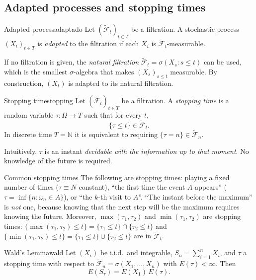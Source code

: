 \documentclass[11pt, a4paper]{article}
\begin{document}
\subsection{Adapted processes and stopping times}

\begin{definicion}{Adapted process}{adaptado}
Let $(\widetilde{\mathcal{F}}_t)_{t \in T}$ be a filtration. A stochastic process
$(X_t)_{t \in T}$ is \emph{adapted} to the filtration if each $X_t$ is
$\widetilde{\mathcal{F}}_t$-measurable.
\end{definicion}

\obs If no filtration is given, the \emph{natural filtration}
$\widetilde{\mathcal{F}}_t = \sigma(X_s : s \le t)$ can be used, which is the smallest $\sigma$-algebra that
makes $(X_s)_{s \le t}$ measurable. By construction, $(X_t)$ is adapted to its natural filtration.

\begin{definicion}{Stopping time}{stopping}
Let $(\widetilde{\mathcal{F}}_t)_{t \in T}$ be a filtration. A \emph{stopping time} is a random
variable $\tau: \Omega \to T$ such that for every $t$,
$$ \{\tau \le t\} \in \widetilde{\mathcal{F}}_t. $$
In discrete time $T = \mathbb{N}$ it is equivalent to requiring $\{\tau = n\} \in \widetilde{\mathcal{F}}_n$.
\end{definicion}

\obs Intuitively, $\tau$ is an instant \emph{decidable with the information up to that moment}.
No knowledge of the future is required.

\begin{ejemplo}{Common stopping times}{}
The following are stopping times: playing a fixed number of times ($\tau \equiv N$ constant), ``the first time
the event $A$ appears'' ($\tau = \inf\{n : \omega_n \in A\}$), or ``the $k$-th visit to
$A$''. ``The instant before the maximum'' is \emph{not} one, because knowing that the next step
will be the maximum requires knowing the future. Moreover, $\max(\tau_1, \tau_2)$ and $\min(\tau_1,
\tau_2)$ are stopping times: $\{\max(\tau_1, \tau_2) \le t\} = \{\tau_1 \le t\} \cap \{\tau_2 \le
t\}$ and $\{\min(\tau_1, \tau_2) \le t\} = \{\tau_1 \le t\} \cup \{\tau_2 \le t\}$ are in
$\widetilde{\mathcal{F}}_t$.
\end{ejemplo}

\begin{teorema}{Wald's Lemma}{wald}
Let $(X_i)$ be i.i.d.\ and integrable, $S_n = \sum_{i=1}^n X_i$, and $\tau$ a stopping time
with respect to $\widetilde{\mathcal{F}}_n = \sigma(X_1, \dots, X_n)$ with $E(\tau) < \infty$.
Then
$$ E(S_\tau) = E(X_1) \, E(\tau). $$
\end{teorema}
\end{document}
